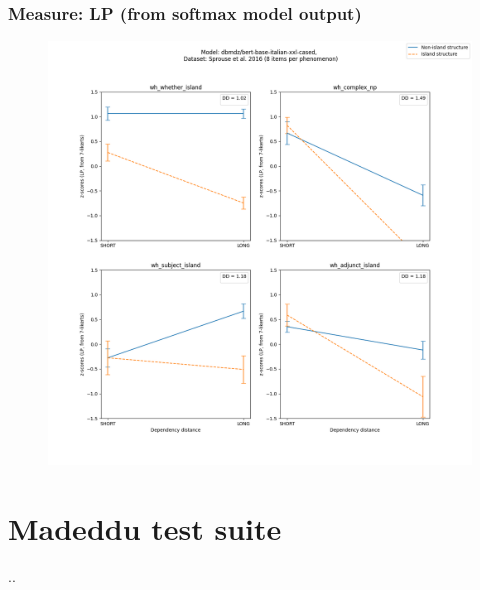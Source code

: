 \subsubsection{Measure: LP (from softmax model output)}
\begin{figure}[h]
	\centering
	\includegraphics[width=1\textwidth]{images/Chapter1/Sprouse_wh_dbmdz_bert-base-italian-xxl-cased_LP-zscores-likert-2022-07-11.png} 
\end{figure}


\section{Madeddu test suite}
..